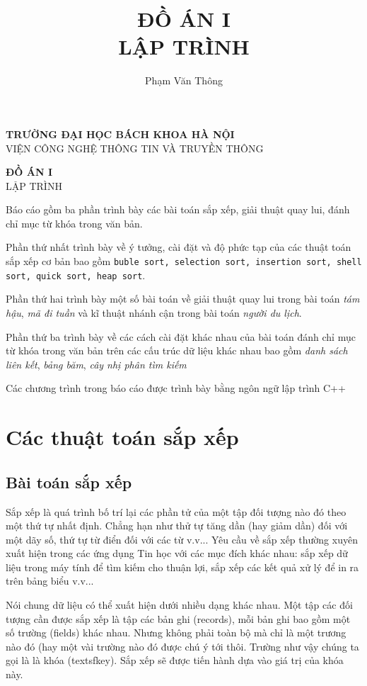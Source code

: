 \documentclass[a4paper]{article}
\title{\textbf{\huge{ĐỒ ÁN I}}\\ \large{\textsc{LẬP TRÌNH}}}
\author{Phạm Văn Thông}
\date{}
\begin{document}
\begin{center}
\textbf{\Large{TRƯỜNG ĐẠI HỌC BÁCH KHOA HÀ NỘI}}\\
\textsc{VIỆN CÔNG NGHỆ THÔNG TIN VÀ TRUYỀN THÔNG}

\vspace{2cm}

\textbf{\Huge{ĐỒ ÁN I}} \\ \LARGE{\textsc{LẬP TRÌNH}}
\author{}
\end{center}

\newpage
\abstract
Báo cáo gồm ba phần trình bày các bài toán sắp xếp, giải thuật quay lui, đánh chỉ mục từ khóa trong văn bản. 

Phần thứ nhất trình bày về ý tưởng, cài đặt và độ phức tạp của các thuật toán sắp xếp cơ bản bao gồm \texttt{buble sort, selection sort, insertion sort, shell sort, quick sort, heap sort}. 

Phần thứ hai trình bày một số bài toán về giải thuật quay lui trong bài toán \emph{tám hậu}, \emph{mã đi tuần} và kĩ thuật nhánh cận trong bài toán \emph{người du lịch}. 

Phần thứ ba trình bày về các cách cài đặt khác nhau của bài toán đánh chỉ mục từ khóa trong văn bản trên các cấu trúc dữ liệu khác nhau bao gồm \emph{danh sách liên kết}, \emph{bảng băm}, \emph{cây nhị phân tìm kiếm}

Các chương trình trong báo cáo được trình bày bằng ngôn ngữ lập trình C++
\section{Các thuật toán sắp xếp}
\subsection{Bài toán sắp xếp}

Sắp xếp là quá trình bố trí lại các phần tử của một tập đối tượng nào đó theo một thứ tự nhất định. Chẳng hạn như thử tự tăng dần (hay giảm dần) đối với một dãy số, thứ tự từ điển đối với các từ v.v... Yêu cầu về sắp xếp thường xuyên xuất hiện trong các ứng dụng Tin học với các mục đích khác nhau: sắp xếp dữ liệu trong máy tính để tìm kiếm cho thuận lợi, sắp xếp các kết quả xử lý để in ra trên bảng biểu v.v...

Nói chung dữ liệu có thể xuất hiện dưới nhiều dạng khác nhau. Một tập các đối tượng cần được sắp xếp là tập các bản ghi (records), mỗi bản ghi bao gồm một số trường (fields) khác nhau. Nhưng không phải toàn bộ mà chỉ là một trương nào đó (hay một vài trường nào đó được chú ý tới thôi. Trường như vậy chúng ta gọi là là \textsf{khóa} (textsf{key}). Sắp xếp sẽ được tiến hành dựa vào giá trị của khóa này.\\
\end{document}
